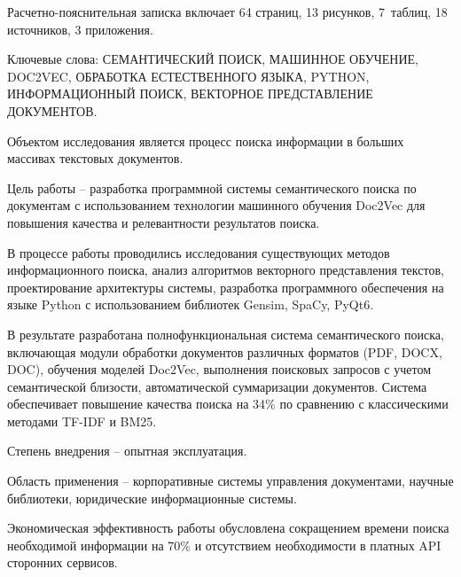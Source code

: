 
Расчетно-пояснительная записка включает 64 страниц, 13 рисунков, 7~таблиц, 18 источников, 3 приложения.

Ключевые слова: СЕМАНТИЧЕСКИЙ ПОИСК, МАШИННОЕ ОБУЧЕНИЕ, DOC2VEC, ОБРАБОТКА ЕСТЕСТВЕННОГО ЯЗЫКА, PYTHON, ИНФОРМАЦИОННЫЙ ПОИСК, ВЕКТОРНОЕ ПРЕДСТАВЛЕНИЕ ДОКУМЕНТОВ.

Объектом исследования является процесс поиска информации в больших массивах текстовых документов.

Цель работы -- разработка программной системы семантического поиска по документам с использованием технологии машинного обучения Doc2Vec для повышения качества и релевантности результатов поиска.

В процессе работы проводились исследования существующих методов информационного поиска, анализ алгоритмов векторного представления текстов, проектирование архитектуры системы, разработка программного обеспечения на языке Python с использованием библиотек Gensim, SpaCy, PyQt6.

В результате разработана полнофункциональная система семантического поиска, включающая модули обработки документов различных форматов (PDF, DOCX, DOC), обучения моделей Doc2Vec, выполнения поисковых запросов с учетом семантической близости, автоматической суммаризации документов. Система обеспечивает повышение качества поиска на 34\% по сравнению с классическими методами TF-IDF и BM25.

Степень внедрения -- опытная эксплуатация.

Область применения -- корпоративные системы управления документами, научные библиотеки, юридические информационные системы.

Экономическая эффективность работы обусловлена сокращением времени поиска необходимой информации на 70\% и отсутствием необходимости в платных API сторонних сервисов.
